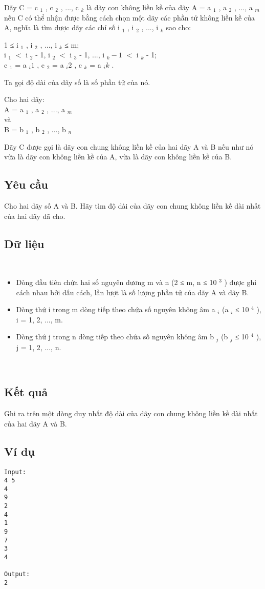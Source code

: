 

Dãy C = c $_ 1 $ , c $_ 2 $ , ..., c $_ k $ là dãy con không liền kề của dãy A = a $_ 1 $ , a $_ 2 $ , ..., a $_ m $ nếu C có thể nhận được bằng cách chọn một dãy các phần tử không liền kề của A, nghĩa là tìm dược dãy các chỉ số i $_ 1 $ , i $_ 2 $ , ..., i $_ k $ sao cho:

1 ≤ i $_ 1 $ , i $_ 2 $ , ..., i $_ k $ ≤ m;
\\i $_ 1 $ $<$ i $_ 2 $ - 1, i $_ 2 $ $<$ i $_ 3 $ - 1, ..., i $_ k - 1 $ $<$ i $_ k $ - 1;
\\c $_ 1 $ = a $_ i1 $ , c $_ 2 $ = a $_ i2 $ , c $_ k $ = a $_ ik $ .

Ta gọi độ dài của dãy số là số phần tử của nó.

Cho hai dãy:
\\A = a $_ 1 $ , a $_ 2 $ , ..., a $_ m $
\\và
\\B = b $_ 1 $ , b $_ 2 $ , ..., b $_ n $

Dãy C được gọi là dãy con chung không liền kề của hai dãy A và B nếu như nó vừa là dãy con không liền kề của A, vừa là dãy con không liền kề của B.

\subsection{Yêu cầu}

Cho hai dãy số A và B. Hãy tìm độ dài của dãy con chung không liền kề dài nhất của hai dãy đã cho.

\subsection{Dữ liệu}

 
\begin{itemize}
	\item Dòng đầu tiên chứa hai số nguyên dương m và n (2 ≤ m, n ≤ 10 $^ 3 $ ) được ghi cách nhau bởi dấu cách, lần lượt là số lượng phần tử của dãy A và dãy B.
	\item Dòng thứ i trong m dòng tiếp theo chứa số nguyên không âm a $_ i $ (a $_ i $ ≤ 10 $^ 4 $ ), i = 1, 2, ..., m.
	\item Dòng thứ j trong n dòng tiếp theo chứa số nguyên không âm b $_ j $ (b $_ j $ ≤ 10 $^ 4 $ ), j = 1, 2, ..., n.
\end{itemize}

 

\subsection{Kết quả}

Ghi ra trên một dòng duy nhất độ dài của dãy con chung không liền kề dài nhất của hai dãy A và B.

\subsection{Ví dụ}
\begin{verbatim}
Input:
4 5
4
9
2
4
1
9
7
3
4

Output:
2
\end{verbatim}